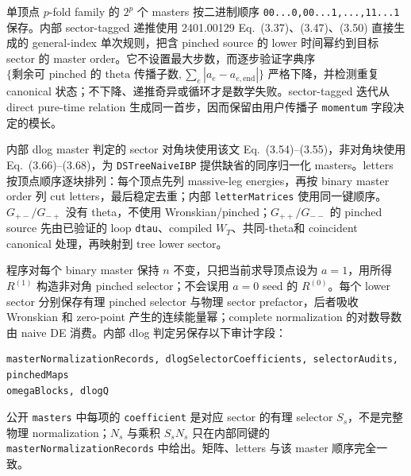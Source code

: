 ﻿\documentclass[a4paper,11pt]{article}
\begin{document}
单顶点 $p$-fold family 的 $2^p$ 个 masters 按二进制顺序 \texttt{00...0,00...1,...,11...1} 保存。内部 sector-tagged 递推使用 2401.00129 Eq.~(3.37)、(3.47)、(3.50) 直接生成的 general-index 单次规则，把含 pinched source 的 lower 时间幂约到目标 sector 的 master order。它不设置最大步数，而逐步验证字典序
$\{\text{剩余可 pinched 的 theta 传播子数},\sum_e|a_e-a_{e,\mathrm{end}}|\}$ 严格下降，并检测重复 canonical 状态；不下降、递推奇异或循环才是数学失败。sector-tagged 迭代从 direct pure-time relation 生成同一首步，因而保留由用户传播子 \texttt{momentum} 字段决定的模长。

内部 dlog master 判定的 sector 对角块使用该文 Eq.~(3.54)--(3.55)，非对角块使用 Eq.~(3.66)--(3.68)，为 \texttt{DSTreeNaiveIBP} 提供缺省的同序归一化 masters。letters 按顶点顺序逐块排列：每个顶点先列 massive-leg energies，再按 binary master order 列 cut letters，最后稳定去重；内部 \texttt{letterMatrices} 使用同一键顺序。$G_{+-}/G_{-+}$ 没有 theta，不使用 Wronskian/pinched；$G_{++}/G_{--}$ 的 pinched source 先由已验证的 loop \texttt{dtau}、compiled $W_T$、共同-theta和 coincident canonical 处理，再映射到 tree lower sector。

程序对每个 binary master 保持 $n$ 不变，只把当前求导顶点设为 $a=1$，用所得 $R^{(1)}$ 构造非对角 pinched selector；不会误用 $a=0$ seed 的 $R^{(0)}$。每个 lower sector 分别保存有理 pinched selector 与物理 sector prefactor，后者吸收 Wronskian 和 zero-point 产生的连续能量幂；complete normalization 的对数导数由 naive DE 消费。内部 dlog 判定另保存以下审计字段：
\begin{verbatim}
masterNormalizationRecords, dlogSelectorCoefficients, selectorAudits, pinchedMaps
omegaBlocks, dlogQ
\end{verbatim}
公开 \texttt{masters} 中每项的 \texttt{coefficient} 是对应 sector 的有理 selector $S_s$，不是完整物理 normalization；$N_s$ 与乘积 $S_sN_s$ 只在内部同键的 \texttt{masterNormalizationRecords} 中给出。矩阵、letters 与该 master 顺序完全一致。
\end{document}
